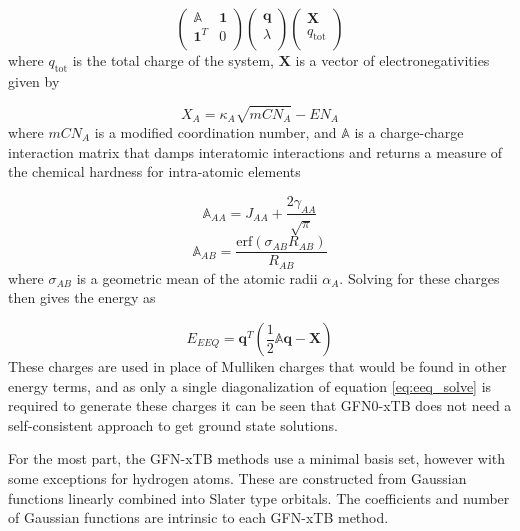 \begin{equation}
    \label{eq:eeq_solve}
    \begin{pmatrix}
        \mathbb{A} & \mathbf{1} \\
        \mathbf{1}^T & 0 \\
    \end{pmatrix}
    \begin{pmatrix}
        \mathbf{q} \\
        \lambda \\
    \end{pmatrix}
    \begin{pmatrix}
        \mathbf{X} \\
        q_\text{tot} \\
    \end{pmatrix}
\end{equation}
%
where $q_\text{tot}$ is the total charge of the system, $\mathbf{X}$ is a vector of 
electronegativities given by

\begin{equation}
    X_A = \kappa_A \sqrt{mCN_A} - EN_A
\end{equation}
%
where $mCN_A$ is a modified coordination number, and $\mathbb{A}$ is a charge-charge
interaction matrix that damps interatomic interactions and returns a measure of 
the chemical hardness for intra-atomic elements

\begin{equation}
    \mathbb{A}_{AA} = J_{AA} + \frac{2\gamma_{AA}}{\sqrt{\pi}}
\end{equation}
%
\begin{equation}
    \mathbb{A}_{AB} = \frac{\text{erf}\left(\sigma_{AB} R_{AB}\right)}{R_{AB}}
\end{equation}
%
where $\sigma_{AB}$ is a geometric mean of the atomic radii $\alpha_A$. Solving 
for these charges then gives the energy as 

\begin{equation}
    E_{EEQ} = \mathbf{q}^T \left(\frac{1}{2}\mathbb{A}\mathbf{q} - \mathbf{X}\right)
\end{equation}
%
These charges are used in place of Mulliken charges that would be found in other
energy terms, and as only a single diagonalization of equation \ref{eq:eeq_solve} 
is required to generate these charges it can be seen that GFN0-xTB does not need
a self-consistent approach to get ground state solutions.

For the most part, the GFN-xTB methods use a minimal basis set, however with some
exceptions for hydrogen atoms. These are constructed from Gaussian functions linearly
combined into Slater type orbitals. The coefficients and number of Gaussian functions
are intrinsic to each GFN-xTB method.

